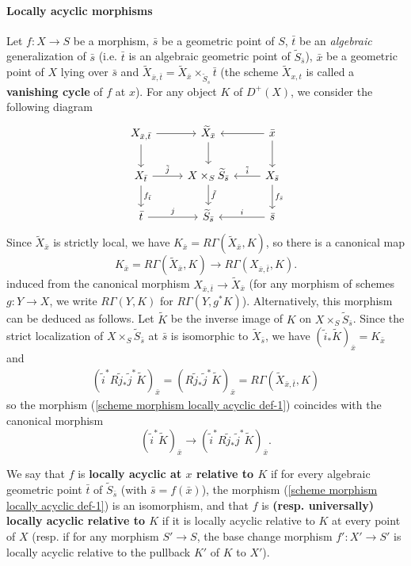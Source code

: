 \paragraph{Locally acyclic morphisms}
Let $f:X\to S$ be a morphism, $\bar{s}$ be a geometric point of $S$, $\bar{t}$ be an \textit{algebraic} generalization of $\bar{s}$ (i.e. $\bar{t}$ is an algebraic geometric point of $\widetilde{S}_{\bar{s}}$), $\bar{x}$ be a geometric point of $X$ lying over $\bar{s}$ and $\widetilde{X}_{\bar{x},\bar{t}}=\widetilde{X}_{\bar{x}}\times_{\widetilde{S}_s}\bar{t}$ (the scheme $\widetilde{X}_{x,t}$ is called a \textbf{vanishing cycle} of $f$ at $x$). For any object $K$ of $D^+(X)$, we consider the following diagram
\[\begin{tikzcd}
X_{\bar{x},\bar{t}}\ar[r]\ar[d]&\widetilde{X}_{\bar{x}}\ar[d]&\bar{x}\ar[d]\ar[l]\\
X_{\bar{t}}\ar[r,"\tilde{j}"]\ar[d,"f_{\bar{t}}"]&X\times_S\widetilde{S}_{\bar{s}}\ar[d,"\tilde{f}"]&X_{\bar{s}}\ar[d,"f_{\bar{s}}"]\ar[l,swap,"\tilde{i}"]\\
\bar{t}\ar[r,"j"]&\widetilde{S}_{\bar{s}}&\bar{s}\ar[l,swap,"i"]
\end{tikzcd}\]
Since $\widetilde{X}_{\bar{x}}$ is strictly local, we have $K_{\bar{x}}=R\Gamma(\widetilde{X}_{\bar{x}},K)$, so there is a canonical map
\begin{equation}\label{scheme morphism locally acyclic def-1}
K_{\bar{x}}=R\Gamma(\widetilde{X}_{\bar{x}},K)\to R\Gamma(X_{\bar{x},\bar{t}},K).
\end{equation}
induced from the canonical morphism $X_{\bar{x},\bar{t}}\to\widetilde{X}_{\bar{x}}$ (for any morphism of schemes $g:Y\to X$, we write $R\Gamma(Y,K)$ for $R\Gamma(Y,g^*K)$). Alternatively, this morphism can be deduced as follows. Let $\widetilde{K}$ be the inverse image of $K$ on $X\times_S\widetilde{S}_{\bar{s}}$. Since the strict localization of $X\times_S\widetilde{S}_{\bar{s}}$ at $\bar{s}$ is isomorphic to $\widetilde{X}_{\bar{s}}$, we have $(\tilde{i}_*\widetilde{K})_{\bar{x}}=K_{\bar{x}}$ and
\begin{align*}
(\tilde{i}^*R\tilde{j}_*\tilde{j}^*\widetilde{K})_{\bar{x}}=(R\tilde{j}_*\tilde{j}^*\widetilde{K})_{\bar{x}}=R\Gamma(\widetilde{X}_{\bar{x},\bar{t}},K)
\end{align*}
so the morphism (\ref{scheme morphism locally acyclic def-1}) coincides with the canonical morphism
\[(\tilde{i}^*\widetilde{K})_{\bar{x}}\to(\tilde{i}^*R\tilde{j}_*\tilde{j}^*\widetilde{K})_{\bar{x}}.\]

We say that $f$ is \textbf{locally acyclic at $x$ relative to $K$} if for every algebraic geometric point $\bar{t}$ of $\widetilde{S}_{\bar{s}}$ (with $\bar{s}=f(\bar{x})$), the morphism (\ref{scheme morphism locally acyclic def-1}) is an isomorphism, and that $f$ is \textbf{(resp. universally) locally acyclic relative to $K$} if it is locally acyclic relative to $K$ at every point of $X$ (resp. if for any morphism $S'\to S$, the base change morphism $f':X'\to S'$ is locally acyclic relative to the pullback $K'$ of $K$ to $X'$).

